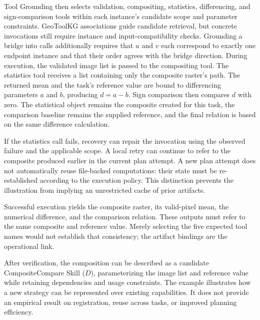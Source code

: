 Tool Grounding then selects validation, compositing, statistics, differencing, and sign-comparison tools within each instance's candidate scope and parameter constraints. GeoToolKG associations guide candidate retrieval, but concrete invocations still require instance and input-compatibility checks. Grounding a bridge into calls additionally requires that $u$ and $v$ each correspond to exactly one endpoint instance and that their order agrees with the bridge direction. During execution, the validated image list is passed to the compositing tool. The statistics tool receives a list containing only the composite raster's path. The returned mean and the task's reference value are bound to differencing parameters $a$ and $b$, producing $d=a-b$. Sign comparison then compares $d$ with zero. The statistical object remains the composite created for this task, the comparison baseline remains the supplied reference, and the final relation is based on the same difference calculation.

If the statistics call fails, recovery can repair the invocation using the observed failure and the applicable scope. A local retry can continue to refer to the composite produced earlier in the current plan attempt. A new plan attempt does not automatically reuse file-backed computations: their state must be re-established according to the execution policy. This distinction prevents the illustration from implying an unrestricted cache of prior artifacts.

Successful execution yields the composite raster, its valid-pixel mean, the numerical difference, and the comparison relation. These outputs must refer to the same composite and reference value. Merely selecting the five expected tool names would not establish that consistency; the artifact bindings are the operational link.

After verification, the composition can be described as a candidate CompositeCompare Skill ($D$), parameterizing the image list and reference value while retaining dependencies and usage constraints. The example illustrates how a new strategy can be represented over existing capabilities. It does not provide an empirical result on registration, reuse across tasks, or improved planning efficiency.
